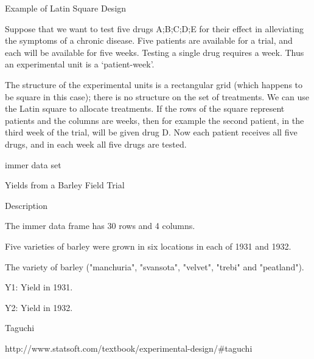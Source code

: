 Example of Latin Square Design


Suppose that we want to test five drugs A;B;C;D;E for their effect in alleviating the symptoms of a chronic disease. Five patients are available for a trial, and each will be available for five weeks. Testing a single drug requires a week. Thus an experimental unit is a ‘patient-week’.


The structure of the experimental units is a rectangular grid (which happens to be square in this case); there is no structure on the set of treatments. We can use the Latin square to allocate treatments. If the rows of the square represent patients and the columns are weeks, then for example the second patient, in the third week of the trial, will be given drug D. Now each patient receives all five drugs, and in each week all five drugs are tested.


immer data set


Yields from a Barley Field Trial

Description


The immer data frame has 30 rows and 4 columns. 

Five varieties of barley were grown in six locations in each of 1931 and 1932.


The variety of barley ("manchuria", "svansota", "velvet", "trebi" and "peatland").

Y1:    Yield in 1931.

Y2:    Yield in 1932.


Taguchi


http://www.statsoft.com/textbook/experimental-design/#taguchi


